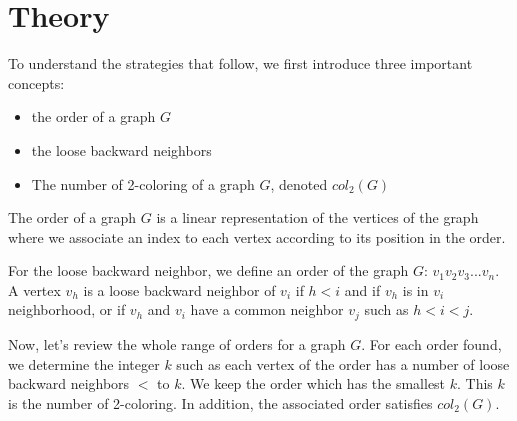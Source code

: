 \chapter{Theory}

To understand the strategies that follow, we first introduce three important concepts:
\begin{itemize}
\item the order of a graph $G$
\item the loose backward neighbors
\item The number of 2-coloring of a graph $G$, denoted $col_{2}(G)$
\end{itemize}

The order of a graph $G$ is a linear representation of the vertices of the graph where we associate an index to each vertex according to its position in the order.

For the loose backward neighbor, we define an order of the graph $G$: $v_{1} v_{2} v_{3}... v_{n}$. A vertex $v_{h}$ is a loose backward neighbor of $v_{i}$ if $h < i$ and if $v_{h}$ is in $v_{i}$ neighborhood, or if $v_{h}$ and $v_{i}$ have a common neighbor $v_{j}$ such as $ h < i < j$.

Now, let's review the whole range of orders for a graph $G$. For each order found, we determine the integer $k$ such as each vertex of the order has a number of loose backward neighbors $<$ to $k$. We keep the order which has the smallest $k$. This $k$ is the number of 2-coloring. In addition, the associated order satisfies $col_{2}(G)$.





